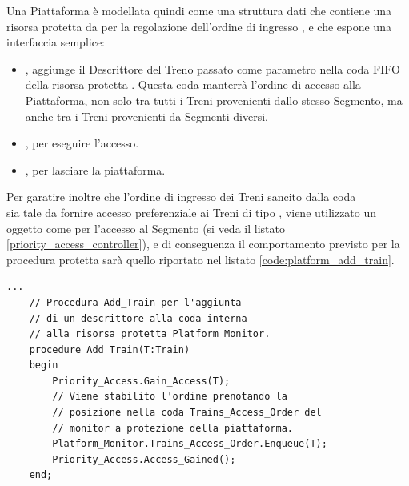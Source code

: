 \begin{description}
		Una Piattaforma è modellata quindi come una struttura dati che contiene una risorsa protetta da  per la regolazione dell'ordine di ingresso , e che espone una interfaccia semplice:
		\begin{itemize}
			\item {}, aggiunge il Descrittore del Treno passato come parametro nella coda FIFO  della risorsa protetta . Questa coda manterrà l'ordine di accesso alla Piattaforma, non solo tra tutti i Treni provenienti dallo stesso Segmento, ma anche tra i Treni provenienti da Segmenti diversi.
			\item {}, per eseguire l'accesso.
			\item {}, per lasciare la piattaforma.
		\end{itemize}
		Per garatire inoltre che l'ordine di ingresso dei Treni sancito dalla coda \\ sia tale da fornire accesso preferenziale ai Treni di tipo , viene utilizzato un oggetto  come per l'accesso al Segmento (si veda il listato \ref{priority_access_controller}), e di conseguenza il comportamento previsto per la procedura protetta  sarà quello riportato nel listato \ref{code:platform_add_train}.
\begin{lstlisting}[caption=\small{Esempio di procedure \ttt{Add\_Train} per l'accesso alla Piattaforma.},label=code:platform_add_train]
	...
	// Procedura Add_Train per l'aggiunta
	// di un descrittore alla coda interna  
	// alla risorsa protetta Platform_Monitor.
	procedure Add_Train(T:Train)
	begin
		Priority_Access.Gain_Access(T);
		// Viene stabilito l'ordine prenotando la 
		// posizione nella coda Trains_Access_Order del
		// monitor a protezione della piattaforma.
		Platform_Monitor.Trains_Access_Order.Enqueue(T);
		Priority_Access.Access_Gained();
	end;
	

\end{lstlisting}
\end{description}
